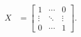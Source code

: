 \documentclass[
  12pt,
  a4paper]{report}
\author{}
\date{\vspace{-2.5em}}
\begin{document}
\begin{align*}
  X &= \begin{bmatrix} 
    1 & \cdots & 0\\
    \vdots & \ddots & \vdots\\
    0 & \cdots & 1 
  \end{bmatrix}.
\end{align*}
\end{document}

